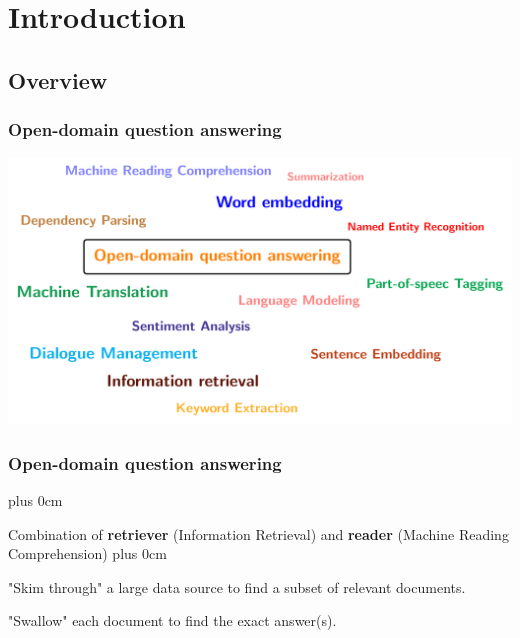\documentclass[11pt]{beamer}
\renewcommand{\raggedright}{\leftskip=0pt \rightskip=0pt plus 0cm}
\let\olditemize=\itemize
\renewenvironment{itemize}{\olditemize\raggedright}{\endlist}
\begin{document}
\section{Introduction}
\subsection{Overview}
\begin{frame}
\frametitle{Open-domain question answering}
\hspace*{-15pt}
\includegraphics[scale=.45]{images/PDF/nlptask/nlptask.pdf}
\end{frame}
\begin{frame}
\frametitle{Open-domain question answering}
\begin{itemize}
	\item Combination of \textbf{retriever} (Information Retrieval) and \textbf{reader} (Machine Reading Comprehension)
	\begin{itemize}
		\item "Skim through" a large data source to find a subset of relevant documents.
		\item "Swallow" each document to find the exact answer(s).
	\end{itemize}
\end{itemize}
\end{frame}
\end{document}
